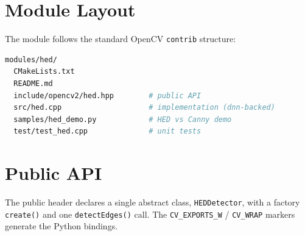 \documentclass[11pt]{article}
\begin{document}
\section{Module Layout}

The module follows the standard OpenCV \texttt{contrib} structure:

\begin{lstlisting}[language=bash, numbers=none]
modules/hed/
  CMakeLists.txt
  README.md
  include/opencv2/hed.hpp        # public API
  src/hed.cpp                    # implementation (dnn-backed)
  samples/hed_demo.py            # HED vs Canny demo
  test/test_hed.cpp              # unit tests
\end{lstlisting}

\section{Public API}

The public header declares a single abstract class, \texttt{HEDDetector}, with a
factory \texttt{create()} and one \texttt{detectEdges()} call. The
\texttt{CV\_EXPORTS\_W} / \texttt{CV\_WRAP} markers generate the Python bindings.
\end{document}
